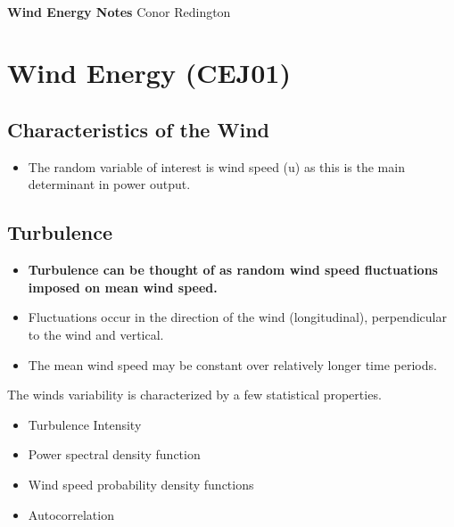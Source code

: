 \documentclass[11pt]{article}
\begin{document}
\thispagestyle{empty}
\bigskip \
\vspace{0.1cm}

\begin{center}
{\fontsize{36}{36} \selectfont \bf \sffamily Wind Energy Notes}
\vskip 24pt
{\fontsize{18}{18} \selectfont \rmfamily Conor Redington} 
\vskip 24pt
\end{center}

{\parindent0pt \baselineskip=15.5pt \lipsum[1-4]}

\newpage
\microtoc
\newpage

\hypertarget{wind-energy-cej01}{%
\section{Wind Energy (CEJ01)}\label{wind-energy-cej01}}

\hypertarget{characteristics-of-the-wind}{%
\subsection{Characteristics of the
Wind}\label{characteristics-of-the-wind}}

\begin{itemize}
\tightlist
\item
  The random variable of interest is wind speed (u) as this is the main
  determinant in power output.
\end{itemize}

\hypertarget{turbulence}{%
\subsection{Turbulence}\label{turbulence}}

\begin{itemize}
\tightlist
\item
  \textbf{Turbulence can be thought of as random wind speed fluctuations
  imposed on mean wind speed.}
\item
  Fluctuations occur in the direction of the wind (longitudinal),
  perpendicular to the wind and vertical.
\item
  The mean wind speed may be constant over relatively longer time
  periods.
\end{itemize}

The winds variability is characterized by a few statistical properties.

\begin{itemize}
\tightlist
\item
  Turbulence Intensity
\item
  Power spectral density function
\item
  Wind speed probability density functions
\item
  Autocorrelation
\end{itemize}
\end{document}
